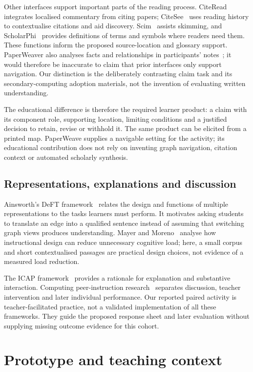 Other interfaces support important parts of the reading process. CiteRead~\cite{citeread} integrates localised commentary from citing papers; CiteSee~\cite{citesee} uses reading history to contextualise citations and aid discovery. Scim~\cite{scim} assists skimming, and ScholarPhi~\cite{scholarphi} provides definitions of terms and symbols where readers need them. These functions inform the proposed source-location and glossary support. PaperWeaver also analyses facts and relationships in participants' notes~\cite{paperweaver}; it would therefore be inaccurate to claim that prior interfaces only support navigation. Our distinction is the deliberately contrasting claim task and its secondary-computing adoption materials, not the invention of evaluating written understanding.

The educational difference is therefore the required learner product: a claim with its component role, supporting location, limiting conditions and a justified decision to retain, revise or withhold it. The same product can be elicited from a printed map. PaperWeave supplies a navigable setting for the activity; its educational contribution does not rely on inventing graph navigation, citation context or automated scholarly synthesis.


\subsection{Representations, explanations and discussion}
Ainsworth's DeFT framework~\cite{ainsworth} relates the design and functions of multiple representations to the tasks learners must perform. It motivates asking students to translate an edge into a qualified sentence instead of assuming that switching graph views produces understanding. Mayer and Moreno~\cite{mayer} analyse how instructional design can reduce unnecessary cognitive load; here, a small corpus and short contextualised passages are practical design choices, not evidence of a measured load reduction.

The ICAP framework~\cite{icap} provides a rationale for explanation and substantive interaction. Computing peer-instruction research~\cite{peerinstruction} separates discussion, teacher intervention and later individual performance. Our reported paired activity is teacher-facilitated practice, not a validated implementation of all these frameworks. They guide the proposed response sheet and later evaluation without supplying missing outcome evidence for this cohort.

\section{Prototype and teaching context}
